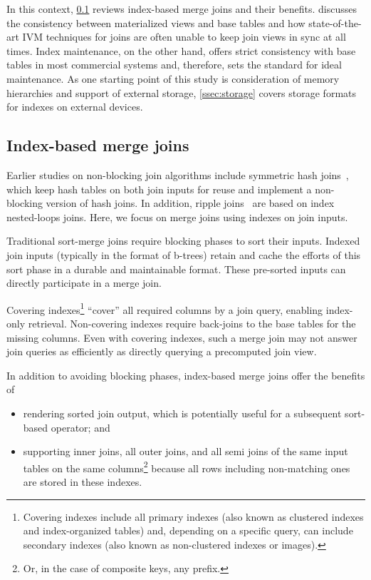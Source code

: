 \documentclass[biblatex, english]{lni}
\begin{document}
In this context, \cref{ssec:index-join} reviews index-based merge joins and their benefits.
 discusses the consistency between materialized views and base tables and how state-of-the-art IVM techniques for joins are often unable to keep join views in sync at all times.
Index maintenance, on the other hand, offers strict consistency with base tables in most commercial systems and, therefore, sets the standard for ideal maintenance.
As one starting point of this study is consideration of memory hierarchies and support of external storage, \cref{ssec:storage} covers storage formats for indexes on external devices.

\subsection{Index-based merge joins}\label{ssec:index-join}

Earlier studies on non-blocking join algorithms include symmetric hash joins~\cite{hong1993shj,wilschut1991shj, Urhan2000XJoinAR, lawrence2005early}, which keep hash tables on both join inputs for reuse and implement a non-blocking version of hash joins.
In addition, ripple joins~\cite{Haas1999RippleJoins, Luo2002hashripple} are based on index nested-loops joins.
Here, we focus on merge joins using indexes on join inputs.

Traditional sort-merge joins require blocking phases to sort their inputs.
Indexed join inputs (typically in the format of b-trees) retain and cache the efforts of this sort phase in a durable and maintainable format.
These pre-sorted inputs can directly participate in a merge join.

Covering indexes\footnote{Covering indexes include all primary indexes (also known as clustered indexes and index-organized tables) and, depending on a specific query, can include secondary indexes (also known as non-clustered indexes or images).} ``cover'' all required columns by a join query, enabling index-only retrieval.
Non-covering indexes require back-joins to the base tables for the missing columns.
Even with covering indexes, such a merge join may not answer join queries as efficiently as directly querying a precomputed join view.

In addition to avoiding blocking phases, index-based merge joins offer the benefits of
\begin{itemize}[noitemsep,topsep=0pt,parsep=0pt,partopsep=0pt]
    \item rendering sorted join output, which is potentially useful for a subsequent sort-based operator; and
    \item supporting inner joins, all outer joins, and all semi joins of the same input tables on the same columns\footnote{Or, in the case of composite keys, any prefix.} because all rows including non-matching ones are stored in these indexes.
\end{itemize}
\end{document}
